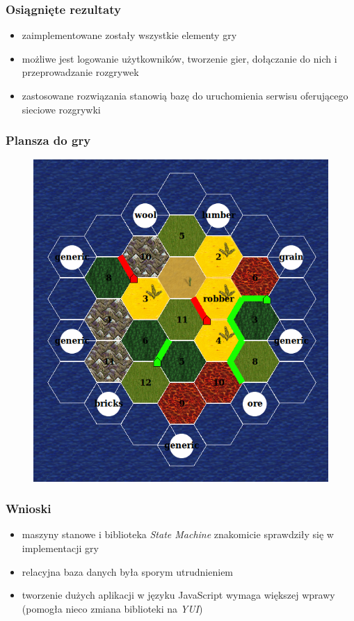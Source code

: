 \documentclass[12pt]{beamer}
\begin{document}
\begin{frame}
  \frametitle{Osiągnięte rezultaty}
  \begin{itemize}
  \item zaimplementowane zostały wszystkie elementy gry
  \item możliwe jest logowanie użytkowników, tworzenie gier,
    dołączanie do nich i przeprowadzanie rozgrywek
  \item zastosowane rozwiązania stanowią bazę do uruchomienia serwisu
    oferującego sieciowe rozgrywki
  \end{itemize}
\end{frame}

\begin{frame}
  \frametitle{Plansza do gry}
  \begin{figure}
    \includegraphics[width=0.6\linewidth]{board.png}
  \end{figure}
\end{frame}

\begin{frame}
  \frametitle{Wnioski}
  \begin{itemize}
  \item maszyny stanowe i biblioteka \emph{State Machine} znakomicie
    sprawdziły się w implementacji gry
  \item relacyjna baza danych była sporym utrudnieniem
  \item tworzenie dużych aplikacji w języku JavaScript wymaga większej
    wprawy (pomogła nieco zmiana biblioteki na \emph{YUI})
  \end{itemize}
\end{frame}
\end{document}
